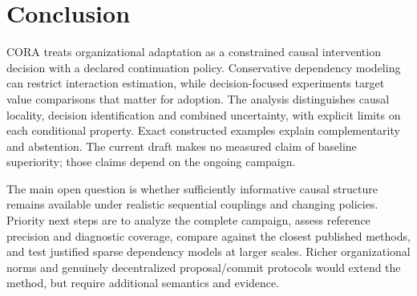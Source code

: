 \documentclass[runningheads]{llncs}
\begin{document}
\section{Conclusion}
CORA treats organizational adaptation as a constrained causal intervention decision with a declared continuation policy. Conservative dependency modeling can restrict interaction estimation, while decision-focused experiments target value comparisons that matter for adoption. The analysis distinguishes causal locality, decision identification and combined uncertainty, with explicit limits on each conditional property. Exact constructed examples explain complementarity and abstention. The current draft makes no measured claim of baseline superiority; those claims depend on the ongoing campaign.

The main open question is whether sufficiently informative causal structure remains available under realistic sequential couplings and changing policies. Priority next steps are to analyze the complete campaign, assess reference precision and diagnostic coverage, compare against the closest published methods, and test justified sparse dependency models at larger scales. Richer organizational norms and genuinely decentralized proposal/commit protocols would extend the method, but require additional semantics and evidence.
\end{document}
